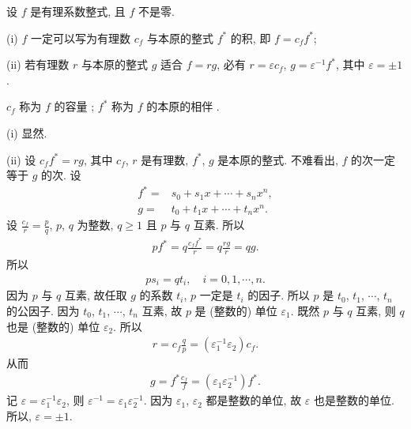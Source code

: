 \begin{proposition}
    设 $f$ 是有理系数整式, 且 $f$ 不是零.

    (i) $f$ 一定可以写为有理数 $c_f$ 与本原的整式 $f^{\ast}$ 的积, 即 $f = c_f f^{\ast}$;

    (ii) 若有理数 $r$ 与本原的整式 $g$ 适合 $f = rg$, 必有 $r = \varepsilon c_f$, $g = \varepsilon^{-1} f^{\ast}$, 其中 $\varepsilon = \pm 1$.

    $c_f$ 称为 $f$ 的容量 ; $f^{\ast}$ 称为 $f$ 的本原的相伴 .
\end{proposition}

\begin{pf}
    (i) 显然.

    (ii) 设 $c_f f^{\ast} = r g$, 其中 $c_f$, $r$ 是有理数, $f^{\ast}$, $g$ 是本原的整式. 不难看出, $f$ 的次一定等于 $g$ 的次. 设
    \begin{align*}
        f^{\ast} = {} & s_0 + s_1 x + \cdots + s_n x^n, \\
        g = {}        & t_0 + t_1 x + \cdots + t_n x^n.
    \end{align*}
    设 $\frac{c_f}{r} = \frac{p}{q}$, $p$, $q$ 为整数, $q \geq 1$ 且 $p$ 与 $q$ 互素. 所以
    \begin{align*}
        p f^{\ast} = q \frac{c_f f^{\ast}}{r} = q \frac{r g}{r} = q g.
    \end{align*}
    所以
    \begin{align*}
        p s_i = q t_i, \quad i = 0,1,\cdots,n.
    \end{align*}
    因为 $p$ 与 $q$ 互素, 故任取 $g$ 的系数 $t_i$, $p$ 一定是 $t_i$ 的因子. 所以 $p$ 是 $t_0$, $t_1$, $\cdots$, $t_n$ 的公因子. 因为 $t_0$, $t_1$, $\cdots$, $t_n$ 互素, 故 $p$ 是 (整数的) 单位 $\varepsilon_1$. 既然 $p$ 与 $q$ 互素, 则 $q$ 也是 (整数的) 单位 $\varepsilon_2$. 所以
    \begin{align*}
        r = c_f \frac{q}{p} = (\varepsilon_1^{-1} \varepsilon_2) c_f.
    \end{align*}
    从而
    \begin{align*}
        g = f^{\ast} \frac{c_f}{f} = (\varepsilon_1 \varepsilon_2^{-1}) f^{\ast}.
    \end{align*}
    记 $\varepsilon = \varepsilon_1^{-1} \varepsilon_2$, 则 $\varepsilon^{-1} = \varepsilon_1 \varepsilon_2^{-1}$. 因为 $\varepsilon_1$, $\varepsilon_2$ 都是整数的单位, 故 $\varepsilon$ 也是整数的单位. 所以, $\varepsilon = \pm 1$.
\end{pf}

